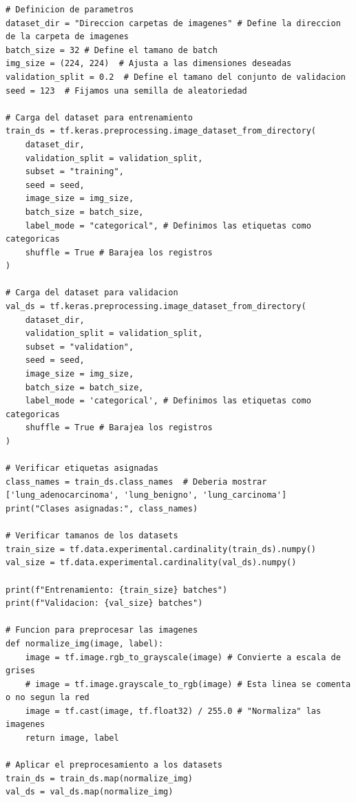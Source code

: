 \begin{lstlisting}[caption={Código creación \textit{dataset} para los modelos de \textit{tensorflow}}]
# Definicion de parametros
dataset_dir = "Direccion carpetas de imagenes" # Define la direccion de la carpeta de imagenes
batch_size = 32 # Define el tamano de batch
img_size = (224, 224)  # Ajusta a las dimensiones deseadas
validation_split = 0.2  # Define el tamano del conjunto de validacion
seed = 123  # Fijamos una semilla de aleatoriedad

# Carga del dataset para entrenamiento
train_ds = tf.keras.preprocessing.image_dataset_from_directory(
    dataset_dir,
    validation_split = validation_split,
    subset = "training",
    seed = seed,
    image_size = img_size,
    batch_size = batch_size,
    label_mode = "categorical", # Definimos las etiquetas como categoricas
    shuffle = True # Barajea los registros
)

# Carga del dataset para validacion
val_ds = tf.keras.preprocessing.image_dataset_from_directory(
    dataset_dir,
    validation_split = validation_split,
    subset = "validation",
    seed = seed,
    image_size = img_size,
    batch_size = batch_size,
    label_mode = 'categorical', # Definimos las etiquetas como categoricas
    shuffle = True # Barajea los registros
)

# Verificar etiquetas asignadas
class_names = train_ds.class_names  # Deberia mostrar ['lung_adenocarcinoma', 'lung_benigno', 'lung_carcinoma']
print("Clases asignadas:", class_names)

# Verificar tamanos de los datasets
train_size = tf.data.experimental.cardinality(train_ds).numpy()
val_size = tf.data.experimental.cardinality(val_ds).numpy()

print(f"Entrenamiento: {train_size} batches")
print(f"Validacion: {val_size} batches")

# Funcion para preprocesar las imagenes
def normalize_img(image, label):
    image = tf.image.rgb_to_grayscale(image) # Convierte a escala de grises
    # image = tf.image.grayscale_to_rgb(image) # Esta linea se comenta o no segun la red
    image = tf.cast(image, tf.float32) / 255.0 # "Normaliza" las imagenes
    return image, label

# Aplicar el preprocesamiento a los datasets
train_ds = train_ds.map(normalize_img)
val_ds = val_ds.map(normalize_img)
\end{lstlisting}


